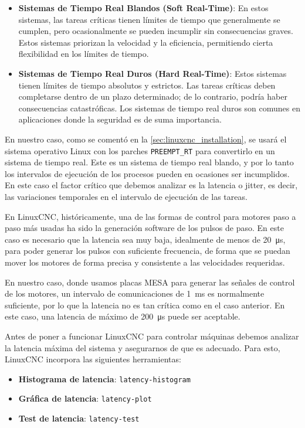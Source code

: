 \documentclass[english,spanish,a4paper,11pt]{article}
\begin{document}
\begin{itemize}
    \item \textbf{Sistemas de Tiempo Real Blandos (Soft Real-Time)}: En estos sistemas, las tareas críticas tienen límites de tiempo que generalmente se cumplen, pero ocasionalmente se pueden incumplir sin consecuencias graves. Estos sistemas priorizan la velocidad y la eficiencia, permitiendo cierta flexibilidad en los límites de tiempo.

    \item \textbf{Sistemas de Tiempo Real Duros (Hard Real-Time)}: Estos sistemas tienen límites de tiempo absolutos y estrictos. Las tareas críticas deben completarse dentro de un plazo determinado; de lo contrario, podría haber consecuencias catastróficas. Los sistemas de tiempo real duros son comunes en aplicaciones donde la seguridad es de suma importancia.
\end{itemize}

En nuestro caso, como se comentó en la \cref{sec:linuxcnc_installation}, se usará el sistema operativo Linux con los parches \texttt{PREEMPT\_RT} para convertirlo en un sistema de tiempo real. Este es un sistema de tiempo real blando, y por lo tanto los intervalos de ejecución de los procesos pueden en ocasiones ser incumplidos. En este caso el factor crítico que debemos analizar es la latencia o jitter, es decir, las variaciones temporales en el intervalo de ejecución de las tareas.

En LinuxCNC, históricamente, una de las formas de control para motores paso a paso más usadas ha sido la generación software de los pulsos de paso. En este caso es necesario que la latencia sea muy baja, idealmente de menos de \qty{20}{\us}, para poder generar los pulsos con suficiente frecuencia, de forma que se puedan mover los motores de forma precisa y consistente a las velocidades requeridas.

En nuestro caso, donde usamos placas MESA para generar las señales de control de los motores, un intervalo de comunicaciones de \qty{1}{\ms} es normalmente suficiente, por lo que la latencia no es tan crítica como en el caso anterior. En este caso, una latencia de máximo de \qty{200}{\us} puede ser aceptable.


Antes de poner a funcionar LinuxCNC para controlar máquinas debemos analizar la latencia máxima del sistema y asegurarnos de que es adecuado. Para esto, LinuxCNC incorpora las siguientes herramientas:
%
\begin{itemize}
    \item \textbf{Histograma de latencia}: \texttt{latency-histogram}
    \item \textbf{Gráfica de latencia}: \texttt{latency-plot}
    \item \textbf{Test de latencia}: \texttt{latency-test}
\end{itemize}
\end{document}
